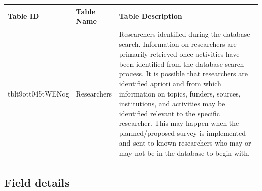 \documentclass[
]{book}
\begin{document}
\begin{table}
\centering
\begin{tabular}{l|l|l}
\hline
\textbf{Table ID} & \textbf{Table Name} & \textbf{Table Description}\\
\hline
tblt9ott045tWENcg & Researchers & Researchers identified during the database search. Information on researchers are primarily retrieved once activities have been identified from the database search process. It is possible that researchers are identified apriori and from which information on topics, funders, sources, institutions, and activities may be identified relevant to the specific researcher. This may happen when the planned/proposed survey is implemented and sent to known researchers who may or may not be in the database to begin with.\\
\hline
\end{tabular}
\end{table}

\hypertarget{field-details-3}{%
\subsection{Field details}\label{field-details-3}}
\end{document}
